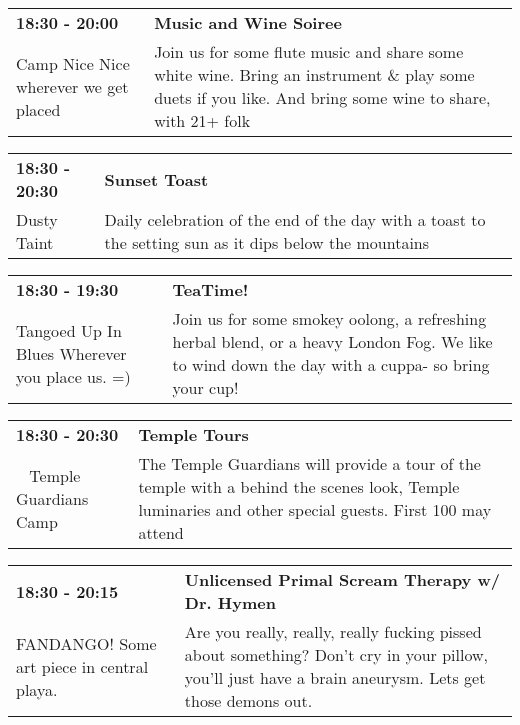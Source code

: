 \begin{tabular}{ p{1in} p{2.2in} }
    \textbf{18:30 - 20:00} & \textbf{Music and Wine Soiree} \\
    Camp Nice Nice \newline wherever we get placed & Join us for some flute music and share some white wine. Bring an instrument \& play some duets if you like. And bring some wine to share, with 21+ folk \\
    \hline 
\end{tabular}
    
\begin{tabular}{ p{1in} p{2.2in} }
    \textbf{18:30 - 20:30} & \textbf{Sunset Toast} \\
    Dusty Taint \newline  & Daily celebration of the end of the day with a toast to the setting sun as it dips below the mountains \\
    \hline 
\end{tabular}
    
\begin{tabular}{ p{1in} p{2.2in} }
    \textbf{18:30 - 19:30} & \textbf{TeaTime!} \\
    Tangoed Up In Blues \newline Wherever you place us. =) & Join us for some smokey oolong, a refreshing herbal blend, or a heavy London Fog.  We like to wind down the day with a cuppa- so bring your cup! \\
    \hline 
\end{tabular}
    
\begin{tabular}{ p{1in} p{2.2in} }
    \textbf{18:30 - 20:30} & \textbf{Temple Tours} \\
    ~ \newline Temple Guardians Camp & The Temple Guardians will provide a tour of the temple with a behind the scenes look, Temple luminaries and other special guests. First 100 may attend \\
    \hline 
\end{tabular}
    
\begin{tabular}{ p{1in} p{2.2in} }
    \textbf{18:30 - 20:15} & \textbf{Unlicensed Primal Scream Therapy w/ Dr. Hymen} \\
    FANDANGO! \newline Some art piece in central playa. & Are you really, really, really fucking pissed about something? Don't cry in your pillow, you'll just have a brain aneurysm. Lets get those demons out. \\
    \hline 
\end{tabular}
    
